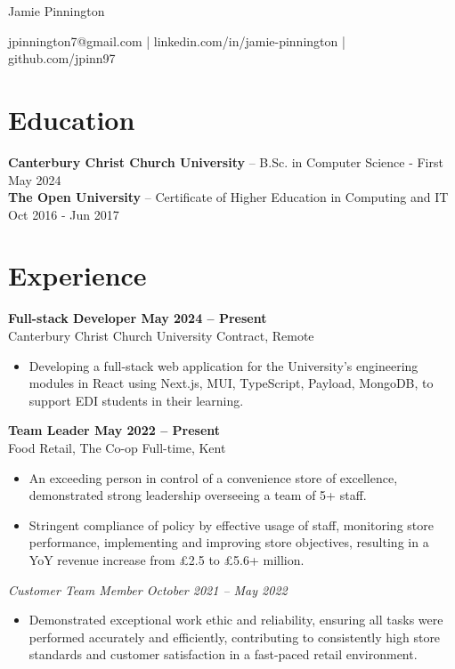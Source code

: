 \documentclass[11pt,letterpaper]{article}
\begin{document}
\centering
\centerline{\Huge Jamie Pinnington}
\vspace{6pt}
\centerline{jpinnington7@gmail.com | linkedin.com/in/jamie-pinnington | github.com/jpinn97}

\section*{Education}
\textbf{Canterbury Christ Church University} -- B.Sc. in Computer Science - First \hfill May 2024 \\
\textbf{The Open University} -- Certificate of Higher Education in Computing and IT \hfill Oct 2016 - Jun 2017

\vspace{-4.5pt}

\section*{Experience}

\textbf{Full-stack Developer \hfill May 2024 -- Present}\\
Canterbury Christ Church University \hfill Contract, Remote \\
\vspace{-10pt}
\begin{itemize}
  \item Developing a full-stack web application for the University's engineering modules in React using Next.js, MUI, TypeScript, Payload, MongoDB, to support EDI students in their learning.
\end{itemize}

\textbf{Team Leader \hfill May 2022 -- Present}\\
Food Retail, The Co-op \hfill Full-time, Kent \\
\vspace{-10pt}
\begin{itemize}
  \item An exceeding person in control of a convenience store of excellence, demonstrated strong leadership overseeing a team of 5+ staff.
  \item Stringent compliance of policy by effective usage of staff, monitoring store performance, implementing and improving store objectives, resulting in a YoY revenue increase from £2.5 to £5.6+ million.
\end{itemize}

\textit{Customer Team Member \hfill October 2021 -- May 2022}\\
\vspace{-10pt}
\begin{itemize}
  \item Demonstrated exceptional work ethic and reliability, ensuring all tasks were performed accurately and efficiently, contributing to consistently high store standards and customer satisfaction in a fast-paced retail environment.
\end{itemize}
\end{document}
